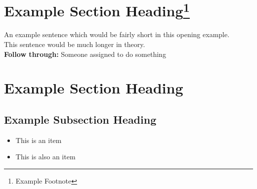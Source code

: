 \documentclass[letterpaper, oneside]{article}
\newcommand{\meetingTitle}{Our Sample Meeting Title}
\begin{document}

\tableofcontents
\newpage

\section{Example Section Heading\footnote{Example Footnote}}

   An example sentence which would be fairly short in this opening example.\\

   This sentence would be much longer in theory.\\

   \textbf{Follow through:} Someone assigned to do something\\

\section{Example Section Heading}

   \subsection{Example Subsection Heading}

      \begin{itemize}
         \item This is an item
         \item This is also an item
      \end{itemize}
\end{document}
